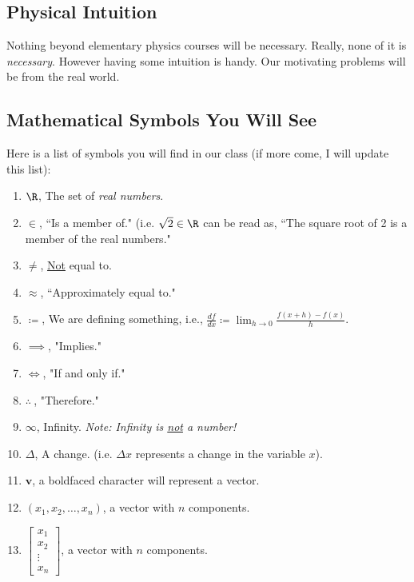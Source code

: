     \subsection{Physical Intuition}
    Nothing beyond elementary physics courses will be necessary.  Really, none of it is \emph{necessary}. However having some intuition is handy. Our motivating problems will be from the real world.  
    
    \subsection{Mathematical Symbols You Will See}

Here is a list of symbols you will find in our class (if more come, I will update this list):

\begin{enumerate}[1.]
\item $\R$, The set of \emph{real numbers}.
\item $\in$, ``Is a member of." (i.e. $\sqrt{2}\in \R$ can be read as, ``The square root of 2 is a member of the real numbers."
\item $\neq$, \underline{Not} equal to.
\item $\approx$, ``Approximately equal to."
\item $\coloneqq$, We are defining something, i.e., $\frac{df}{dx}\coloneqq \lim_{h\to 0}\frac{f(x+h)-f(x)}{h}$.
\item $\implies$, "Implies."
\item $\iff$, "If and only if."
\item $\therefore~$, "Therefore."
\item $\infty$, Infinity.  \emph{Note: Infinity is \underline{not} a number!}
\item $\Delta$, A change. (i.e. $\Delta x$ represents a change in the variable $x$).
\item $\mathbf{v}$, a boldfaced character will represent a vector.
\item $(x_1,x_2,\dots,x_n)$, a vector with $n$ components.
\item $\begin{bmatrix} x_1\\ x_2\\ \vdots \\ x_n\end{bmatrix}$, a vector with $n$ components.
\end{enumerate}
    

